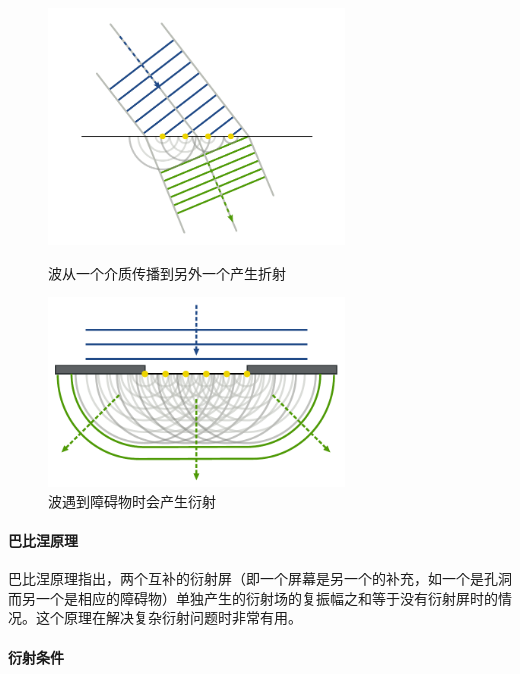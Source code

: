 \documentclass[a4paper]{../phyreport}
\begin{document}
\begin{figure}[H]
  \centering
  \begin{minipage}[t]{0.40\textwidth}
    \centering
    \includegraphics[width=0.7\textwidth]{fig/Refraction_-_Huygens-Fresnel_principle.pdf}
    \caption{波从一个介质传播到另外一个产生折射}
  \end{minipage}
  \qquad
  \begin{minipage}[t]{0.40\textwidth}
    \centering
    \includegraphics[width=0.7\textwidth]{fig/Refraction_on_an_aperture_-_Huygens-Fresnel_principle.pdf}
    \caption{波遇到障碍物时会产生衍射}
  \end{minipage}
\end{figure}

\paragraph{巴比涅原理}

巴比涅原理指出，两个互补的衍射屏（即一个屏幕是另一个的补充，如一个是孔洞而另一个是相应的障碍物）单独产生的衍射场的复振幅之和等于没有衍射屏时的情况。这个原理在解决复杂衍射问题时非常有用。

\paragraph{衍射条件}
\end{document}
